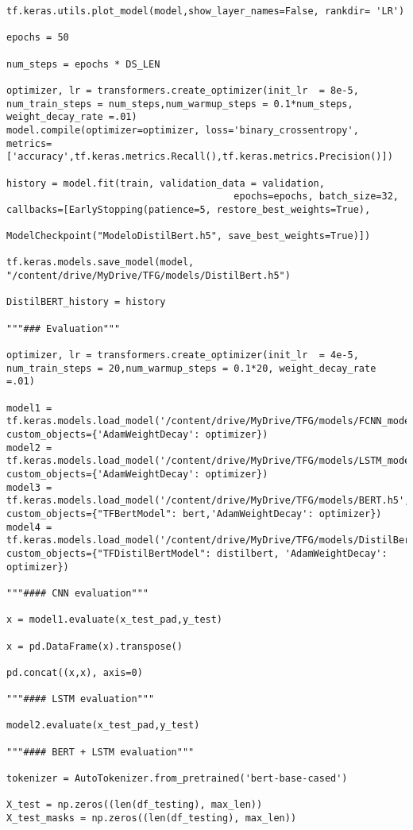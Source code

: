 \documentclass[10pt,riqno,a4paper,twoside]{article}\usepackage[]{graphicx}\usepackage[]{color}
\begin{document}
\begin{lstlisting}
tf.keras.utils.plot_model(model,show_layer_names=False, rankdir= 'LR')

epochs = 50

num_steps = epochs * DS_LEN

optimizer, lr = transformers.create_optimizer(init_lr  = 8e-5, num_train_steps = num_steps,num_warmup_steps = 0.1*num_steps, weight_decay_rate =.01)
model.compile(optimizer=optimizer, loss='binary_crossentropy', metrics=['accuracy',tf.keras.metrics.Recall(),tf.keras.metrics.Precision()])

history = model.fit(train, validation_data = validation, 
                                        epochs=epochs, batch_size=32, callbacks=[EarlyStopping(patience=5, restore_best_weights=True), 
                                       ModelCheckpoint("ModeloDistilBert.h5", save_best_weights=True)])

tf.keras.models.save_model(model, "/content/drive/MyDrive/TFG/models/DistilBert.h5")

DistilBERT_history = history

"""### Evaluation"""

optimizer, lr = transformers.create_optimizer(init_lr  = 4e-5, num_train_steps = 20,num_warmup_steps = 0.1*20, weight_decay_rate =.01)

model1 = tf.keras.models.load_model('/content/drive/MyDrive/TFG/models/FCNN_model.h5', custom_objects={'AdamWeightDecay': optimizer})
model2 = tf.keras.models.load_model('/content/drive/MyDrive/TFG/models/LSTM_model.h5', custom_objects={'AdamWeightDecay': optimizer})
model3 = tf.keras.models.load_model('/content/drive/MyDrive/TFG/models/BERT.h5', custom_objects={"TFBertModel": bert,'AdamWeightDecay': optimizer})
model4 = tf.keras.models.load_model('/content/drive/MyDrive/TFG/models/DistilBert.h5', custom_objects={"TFDistilBertModel": distilbert, 'AdamWeightDecay': optimizer})

"""#### CNN evaluation"""

x = model1.evaluate(x_test_pad,y_test)

x = pd.DataFrame(x).transpose()

pd.concat((x,x), axis=0)

"""#### LSTM evaluation"""

model2.evaluate(x_test_pad,y_test)

"""#### BERT + LSTM evaluation"""

tokenizer = AutoTokenizer.from_pretrained('bert-base-cased')

X_test = np.zeros((len(df_testing), max_len))
X_test_masks = np.zeros((len(df_testing), max_len))


\end{lstlisting}
\end{document}
